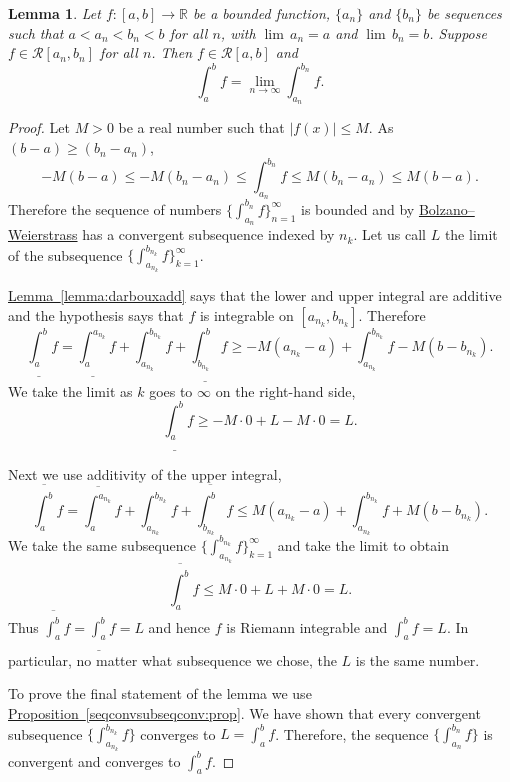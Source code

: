 \documentclass[12pt]{book}
\newcommand{\abs}[1]{\left\lvert {#1} \right\rvert}
\newcommand{\R}{{\mathbb{R}}}
\newcommand{\sR}{{\mathcal{R}}}
\theoremstyle{plain}
\newtheorem{lemma}[thm]{Lemma}
\theoremstyle{remark}
\theoremstyle{definition}
\theoremstyle{exercise}
\theoremstyle{example}
\newcommand{\propref}[1]{\hyperref[#1]{Proposition~\ref*{#1}}}
\newcommand{\lemmaref}[1]{\hyperref[#1]{Lemma~\ref*{#1}}}
\begin{document}
\begin{lemma} \label{lemma:boundedimpriemann}
Let $f \colon [a,b] \to \R$ be a bounded function,
$\{ a_n \}$ and $\{b_n \}$ be sequences such that
$a < a_n < b_n < b$ for all $n$, with
$\lim \, a_n = a$ and $\lim \, b_n = b$.
Suppose $f \in \sR[a_n,b_n]$ for all $n$.
Then $f \in \sR[a,b]$ and
\begin{equation*}
\int_a^b f = 
\lim_{n \to \infty} \int_{a_n}^{b_n} f .
\end{equation*}
\end{lemma}

\begin{proof}
Let $M > 0$ be a real number such that $\abs{f(x)} \leq M$.
As $(b-a) \geq (b_n-a_n)$,
\begin{equation*}
-M(b-a) \leq
-M(b_n-a_n) \leq
\int_{a_n}^{b_n} f
\leq
M(b_n-a_n) \leq
M(b-a) .
\end{equation*}
Therefore the sequence of numbers
$\{ \int_{a_n}^{b_n} f \}_{n=1}^\infty$ is bounded and by
\hyperref[thm:bwseq]{Bolzano--Weierstrass}
has a convergent subsequence indexed by $n_k$.  Let us call
$L$ the limit of the subsequence
$\{ \int_{a_{n_k}}^{b_{n_k}} f \}_{k=1}^\infty$.

\lemmaref{lemma:darbouxadd} says that
the lower and upper integral are additive
and the hypothesis says that
$f$ is integrable on $[a_{n_k},b_{n_k}]$.
Therefore
\begin{equation*}
\underline{\int_a^b} f
=
\underline{\int_a^{a_{n_k}}} f
+
\int_{a_{n_k}}^{b_{n_k}} f
+
\underline{\int_{b_{n_k}}^b} f
\geq
-M(a_{n_k}-a)
+
\int_{a_{n_k}}^{b_{n_k}} f
-
M(b-b_{n_k}) .
\end{equation*}
We take the limit as $k$ goes to $\infty$ on the right-hand side,
\begin{equation*}
\underline{\int_a^b} f
\geq
-M\cdot 0
+
L
-
M\cdot 0
= L .
\end{equation*}

Next we use additivity of the upper integral,
\begin{equation*}
\overline{\int_a^b} f
=
\overline{\int_a^{a_{n_k}}} f
+
\int_{a_{n_k}}^{b_{n_k}} f
+
\overline{\int_{b_{n_k}}^b} f
\leq
M(a_{n_k}-a)
+
\int_{a_{n_k}}^{b_{n_k}} f
+
M(b-b_{n_k}) .
\end{equation*}
We take the same subsequence 
$\{ \int_{a_{n_k}}^{b_{n_k}} f \}_{k=1}^\infty$ and take the limit 
to obtain
\begin{equation*}
\overline{\int_a^b} f
\leq
M\cdot 0
+
L
+
M\cdot 0
= L .
\end{equation*}
Thus $\overline{\int_a^b} f = \underline{\int_a^b} f = L$
and hence $f$ is Riemann integrable and $\int_a^b f = L$.
In particular, no matter what
subsequence we chose,
the $L$ is the same number.

To prove the final statement of the lemma we use 
\propref{seqconvsubseqconv:prop}.  We have shown that every convergent
subsequence
$\{ \int_{a_{n_k}}^{b_{n_k}} f \}$ converges to $L = \int_a^b f$.
Therefore, the sequence
$\{ \int_{a_n}^{b_n} f \}$ is convergent and converges to $\int_a^b f$.
\end{proof}
\end{document}
